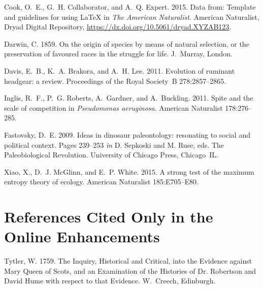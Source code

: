 ﻿\documentclass[11pt]{article}
\begin{document}
\begin{thebibliography}{}

Cook, O.~E., G.~H. Collaborator, and A.~Q. Expert. 2015.
\newblock Data from: Template and guidelines for using \LaTeX{} in \textit{The American Naturalist}.
\newblock American Naturalist, Dryad Digital Repository, \url{https://dx.doi.org/10.5061/dryad.XYZAB123}.

Darwin, C. 1859.
\newblock On the origin of species by means of natural selection, or the preservation of favoured races in the struggle for life.
\newblock J.~Murray, London.

Davis, E.~B., K.~A. Brakora, and A.~H. Lee. 2011.
\newblock Evolution of ruminant headgear: a review.
\newblock Proceedings of the Royal Society~B 278:2857--2865.

Inglis, R.~F., P.~G. Roberts, A.~Gardner, and A.~Buckling. 2011.
\newblock Spite and the scale of competition in \textit{Pseudomonas
  aeruginosa}.
\newblock American Naturalist 178:276--285.

Fastovsky, D.~E. 2009.
\newblock Ideas in dinosaur paleontology: resonating to social and political context.
\newblock Pages 239--253 \emph{in} D. Sepkoski and M. Ruse, eds. The Paleobiological Revolution. University of Chicago Press, Chicago~IL.

Xiao, X., D.~J. McGlinn, and E.~P. White. 2015.
\newblock A strong test of the maximum entropy theory of ecology.
\newblock American Naturalist 185:E705--E80.

\section*{References Cited Only in the Online Enhancements}


Tytler, W. 1759.
\newblock The Inquiry, Historical and Critical, into the Evidence against Mary Queen of Scots, and an Examination of the Histories of Dr. Robertson and David Hume with respect to that Evidence.
\newblock W.~Creech, Edinburgh.

\end{thebibliography}
\end{document}

